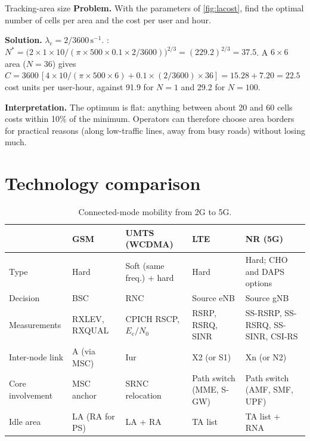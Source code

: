 \documentclass[11pt,a4paper]{article}
\begin{document}
\begin{examplebox}{Tracking-area size}\label{ex:la}
\textbf{Problem.} With the parameters of \cref{fig:lacost}, find the optimal number of cells per
area and the cost per user and hour.

\textbf{Solution.} $\lambda_\mathrm{c} = 2/3600\,\mathrm{s}^{-1}$. :
$N^\ast = \bigl(2\times1\times10/(\pi\times500\times0.1\times2/3600)\bigr)^{2/3} = (229.2)^{2/3} = 37.5$.
A $6\times6$ area ($N=36$) gives $C = 3600\,[4\times10/(\pi\times500\times6) + 0.1\times(2/3600)\times36]
= 15.28 + 7.20 = 22.5$ cost units per user-hour, against 91.9 for $N=1$ and 29.2 for $N=100$.

\textbf{Interpretation.} The optimum is flat: anything between about 20 and 60 cells costs within
10\% of the minimum. Operators can therefore choose area borders for practical reasons (along
low-traffic lines, away from busy roads) without losing much.
\end{examplebox}

\section{Technology comparison}
\begin{table}[htbp]
\centering\small
\caption{Connected-mode mobility from 2G to 5G.}\label{tab:compare}
\begin{tabularx}{\linewidth}{@{}l Y Y Y Y@{}}
\toprule
{} & GSM & UMTS (WCDMA) & LTE & NR (5G) \\
\midrule
Type            & Hard            & Soft (same freq.) + hard & Hard                   & Hard; CHO and DAPS options \\
Decision        & BSC             & RNC                      & Source eNB             & Source gNB \\
Measurements    & RXLEV, RXQUAL   & CPICH RSCP, $E_\mathrm{c}/N_0$ & RSRP, RSRQ, SINR & SS-RSRP, SS-RSRQ, SS-SINR, CSI-RS \\
Inter-node link & A (via MSC)     & Iur                      & X2 (or S1)             & Xn (or N2) \\
Core involvement& MSC anchor      & SRNC relocation          & Path switch (MME, S-GW)& Path switch (AMF, SMF, UPF) \\
Idle area       & LA (RA for PS)  & LA + RA                  & TA list                & TA list + RNA \\
\bottomrule
\end{tabularx}
\end{table}
\end{document}
